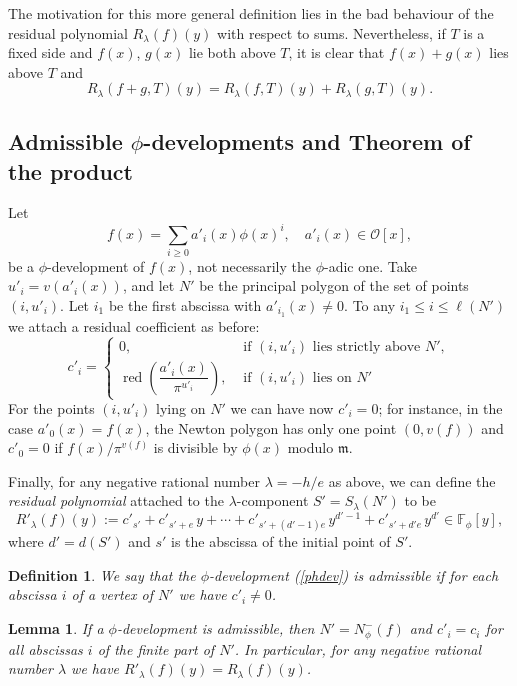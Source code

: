 \documentclass{amsart}
\newtheorem{lemma}[theorem]{Lemma}
\newtheorem{definition}[theorem]{Definition}
\def\op{\operatorname}
\def\as#1{\renewcommand\arraystretch{#1}}
\def\fph{\mathbb{F}_{\phi}}
\def\la{\lambda}
\def\m{{\mathfrak m}}
\def\npp#1{N_{\phi}^-(#1)}
\def\oo{{\mathcal O}}
\def\rd{\op{red}}
\def\zpx{\oo[x]}
\begin{document}
The motivation for this more general definition lies in the bad behaviour of the residual polynomial $R_{\la}(f)(y)$ with respect to sums. Nevertheless, if $T$ is a fixed side and $f(x)$, $g(x)$ lie both above $T$, it is clear that $f(x)+g(x)$ lies above $T$ and 
\begin{equation}\label{sumR}
R_{\la}(f+g,T)(y)=R_{\la}(f,T)(y)+R_{\la}(g,T)(y).
\end{equation}


\subsection{Admissible $\phi$-developments and Theorem of the product}\label{thproduct}
Let
\begin{equation}\label{phdev}
f(x)=\sum_{i\ge 0}a'_i(x)\phi(x)^i,\quad a'_i(x)\in\zpx,
\end{equation}
be a $\phi$-development of $f(x)$, not necessarily the $\phi$-adic
one. Take $u'_i=v(a'_i(x))$, and let $N'$ be the
principal polygon of the set of points $(i,u'_i)$. Let $i_1$ be the first abscissa with $a'_{i_1}(x)\ne0$. To any $i_1\le i\le \ell(N')$ we attach a residual coefficient as before:
 $$\as{1.6}
c'_i=\left\{\begin{array}{ll}
0,&\mbox{ if $(i,u'_i)$ lies strictly above }N',\\\rd\left(\dfrac{a'_i(x)}{\pi^{u'_i}}\right),&\mbox{ if $(i,u'_i)$ lies on }N'
\end{array}
\right.
$$ 
For the points $(i,u'_i)$ lying on $N'$ we can have now $c'_i=0$; for instance, in the case $a'_0(x)=f(x)$, the Newton polygon has only one point $(0,v(f))$ and $c'_0=0$ if $f(x)/\pi^{v(f)}$ is divisible by $\phi(x)$ modulo $\m$.

Finally, for any negative rational number $\la=-h/e$ as above, we can define the \emph{residual polynomial} attached to the $\la$-component $S'=S_{\la}(N')$ to be 
$$
R'_{\la}(f)(y):=c'_{s'}+c'_{s'+e}\,y+\cdots+c'_{s'+(d'-1)e}\,y^{d'-1}+c'_{s'+d'e}\,y^{d'}\in\fph[y],
$$where  $d'=d(S')$ and $s'$ is the abscissa of the initial point of $S'$.

\begin{definition}
We say that the $\phi$-development (\ref{phdev}) is admissible if
for each abs\-cissa $i$ of a vertex of $N'$
we have $c'_i\ne0$.
\end{definition}

\begin{lemma}\label{admissible}
If a $\phi$-development is admissible, then
$N'=\npp{f}$ and $c'_i=c_i$ for all abscissas $i$ of the finite part of $N'$. In particular, for any negative rational number $\la$ we have $R'_{\la}(f)(y)=R_{\la}(f)(y)$.
\end{lemma}
\end{document}
